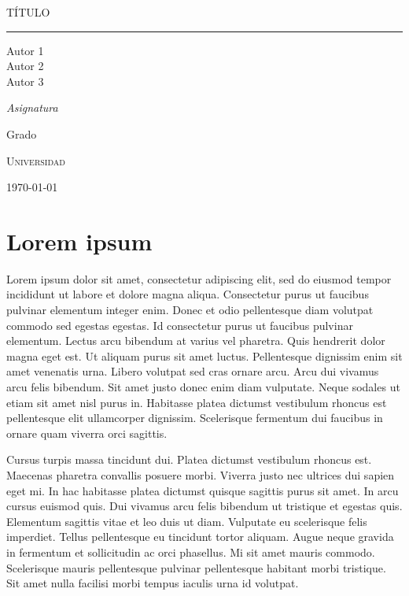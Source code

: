 \documentclass[
  a4paper,
  12pt,
  spanish,
]{scrartcl}
\DeclareRobustCommand{\spacedallcaps}[1]{{\linespread{1.3}\sacshape\MakeTextUppercase{#1}}}%
\newcommand{\horrule}[1]{\rule{\linewidth}{#1}}
\begin{document}
\begin{titlepage}
  \vspace*{4cm}

  \begin{flushleft}
    \Huge
    \spacedallcaps{Título}
    \horrule{2pt}
  \end{flushleft}

  \vspace{2em}

  \begin{flushright}
    \large
    Autor 1\\
    Autor 2\\
    Autor 3\vspace{1em}

    \textit{Asignatura}

    Grado

    \textsc{Universidad}\vspace{1em}

    \today\vspace{.5em}
  \end{flushright}
\end{titlepage}

\newpage

{\hypersetup{hidelinks}
\tableofcontents
}

\newpage

\section{Lorem ipsum}

Lorem ipsum dolor sit amet, consectetur adipiscing elit, sed do eiusmod tempor incididunt ut labore et dolore magna aliqua. Consectetur purus ut faucibus pulvinar elementum integer enim. Donec et odio pellentesque diam volutpat commodo sed egestas egestas. Id consectetur purus ut faucibus pulvinar elementum. Lectus arcu bibendum at varius vel pharetra. Quis hendrerit dolor magna eget est. Ut aliquam purus sit amet luctus. Pellentesque dignissim enim sit amet venenatis urna. Libero volutpat sed cras ornare arcu. Arcu dui vivamus arcu felis bibendum. Sit amet justo donec enim diam vulputate. Neque sodales ut etiam sit amet nisl purus in. Habitasse platea dictumst vestibulum rhoncus est pellentesque elit ullamcorper dignissim. Scelerisque fermentum dui faucibus in ornare quam viverra orci sagittis.

Cursus turpis massa tincidunt dui. Platea dictumst vestibulum rhoncus est. Maecenas pharetra convallis posuere morbi. Viverra justo nec ultrices dui sapien eget mi. In hac habitasse platea dictumst quisque sagittis purus sit amet. In arcu cursus euismod quis. Dui vivamus arcu felis bibendum ut tristique et egestas quis. Elementum sagittis vitae et leo duis ut diam. Vulputate eu scelerisque felis imperdiet. Tellus pellentesque eu tincidunt tortor aliquam. Augue neque gravida in fermentum et sollicitudin ac orci phasellus. Mi sit amet mauris commodo. Scelerisque mauris pellentesque pulvinar pellentesque habitant morbi tristique. Sit amet nulla facilisi morbi tempus iaculis urna id volutpat.
\end{document}
